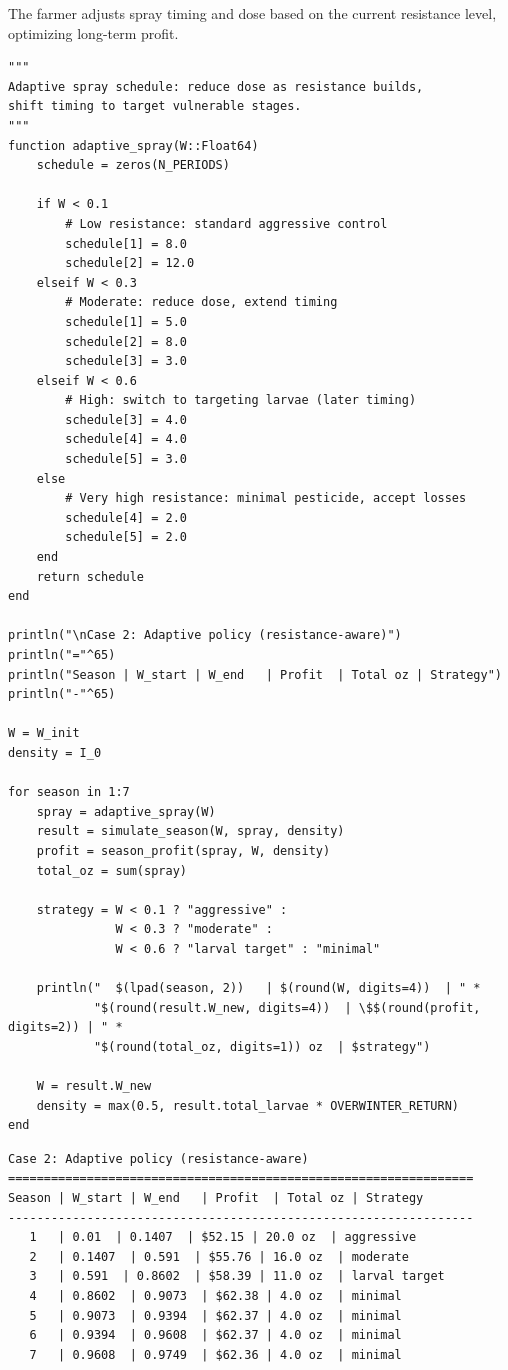 \label{38359145846069017}{}


The farmer adjusts spray timing and dose based on the current resistance level, optimizing long-term profit.




\begin{verbatim}
"""
Adaptive spray schedule: reduce dose as resistance builds,
shift timing to target vulnerable stages.
"""
function adaptive_spray(W::Float64)
    schedule = zeros(N_PERIODS)

    if W < 0.1
        # Low resistance: standard aggressive control
        schedule[1] = 8.0
        schedule[2] = 12.0
    elseif W < 0.3
        # Moderate: reduce dose, extend timing
        schedule[1] = 5.0
        schedule[2] = 8.0
        schedule[3] = 3.0
    elseif W < 0.6
        # High: switch to targeting larvae (later timing)
        schedule[3] = 4.0
        schedule[4] = 4.0
        schedule[5] = 3.0
    else
        # Very high resistance: minimal pesticide, accept losses
        schedule[4] = 2.0
        schedule[5] = 2.0
    end
    return schedule
end

println("\nCase 2: Adaptive policy (resistance-aware)")
println("="^65)
println("Season | W_start | W_end   | Profit  | Total oz | Strategy")
println("-"^65)

W = W_init
density = I_0

for season in 1:7
    spray = adaptive_spray(W)
    result = simulate_season(W, spray, density)
    profit = season_profit(spray, W, density)
    total_oz = sum(spray)

    strategy = W < 0.1 ? "aggressive" :
               W < 0.3 ? "moderate" :
               W < 0.6 ? "larval target" : "minimal"

    println("  $(lpad(season, 2))   | $(round(W, digits=4))  | " *
            "$(round(result.W_new, digits=4))  | \$$(round(profit, digits=2)) | " *
            "$(round(total_oz, digits=1)) oz  | $strategy")

    W = result.W_new
    density = max(0.5, result.total_larvae * OVERWINTER_RETURN)
end
\end{verbatim}




\begin{verbatim}
Case 2: Adaptive policy (resistance-aware)
=================================================================
Season | W_start | W_end   | Profit  | Total oz | Strategy
-----------------------------------------------------------------
   1   | 0.01  | 0.1407  | $52.15 | 20.0 oz  | aggressive
   2   | 0.1407  | 0.591  | $55.76 | 16.0 oz  | moderate
   3   | 0.591  | 0.8602  | $58.39 | 11.0 oz  | larval target
   4   | 0.8602  | 0.9073  | $62.38 | 4.0 oz  | minimal
   5   | 0.9073  | 0.9394  | $62.37 | 4.0 oz  | minimal
   6   | 0.9394  | 0.9608  | $62.37 | 4.0 oz  | minimal
   7   | 0.9608  | 0.9749  | $62.36 | 4.0 oz  | minimal
\end{verbatim}



